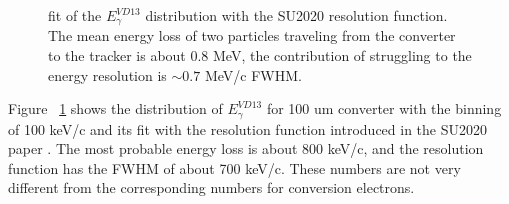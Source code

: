\begin{figure}[H]
  \caption{
    \label{figure:pipenu_bpip4b0_murat_track_ana_trk_0_p_fit}
    fit of the $E_\gamma^{VD13}$ distribution with the SU2020 resolution function.
    The mean energy loss of two particles traveling from the converter to the tracker is about 0.8 MeV,
    the contribution of struggling to the energy resolution is $\sim 0.7$ MeV/c FWHM. \\
  }
\end{figure}

Figure ~\ref{figure:pipenu_bpip4b0_murat_track_ana_trk_0_p_fit} shows the distribution of $E_\gamma^{VD13}$
for 100 um converter with the binning of 100 keV/c and its fit with the resolution function introduced
in the SU2020 paper \cite{SU2020_PAPER}. The most probable energy loss is about 800 keV/c, 
and the resolution function has the FWHM of about 700 keV/c.
These numbers are not very different from the corresponding numbers for conversion electrons.

